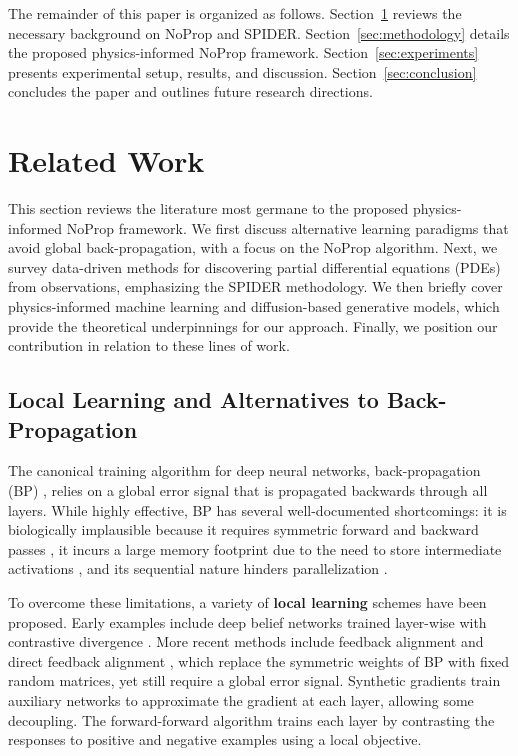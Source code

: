 \documentclass[preprint,12pt]{elsarticle}
\begin{document}
The remainder of this paper is organized as follows. Section~\ref{sec:related} reviews the necessary background on NoProp and SPIDER. Section~\ref{sec:methodology} details the proposed physics-informed NoProp framework. Section~\ref{sec:experiments} presents experimental setup, results, and discussion. Section~\ref{sec:conclusion} concludes the paper and outlines future research directions.


\section{Related Work}
\label{sec:related}

This section reviews the literature most germane to the proposed physics-informed NoProp framework. We first discuss alternative learning paradigms that avoid global back-propagation, with a focus on the NoProp algorithm. Next, we survey data-driven methods for discovering partial differential equations (PDEs) from observations, emphasizing the SPIDER methodology. We then briefly cover physics-informed machine learning and diffusion-based generative models, which provide the theoretical underpinnings for our approach. Finally, we position our contribution in relation to these lines of work.

\subsection{Local Learning and Alternatives to Back-Propagation}
\label{sec:local-learning}

The canonical training algorithm for deep neural networks, back-propagation (BP) \cite{rumelhart1986learning}, relies on a global error signal that is propagated backwards through all layers. While highly effective, BP has several well-documented shortcomings: it is biologically implausible because it requires symmetric forward and backward passes \cite{grossberg1987competitive,lillicrap2016random}, it incurs a large memory footprint due to the need to store intermediate activations \cite{rumelhart1986learning}, and its sequential nature hinders parallelization \cite{carreira2014distributed}.

To overcome these limitations, a variety of \textbf{local learning} schemes have been proposed. Early examples include deep belief networks trained layer-wise with contrastive divergence \cite{hinton2006fast}. More recent methods include feedback alignment \cite{lillicrap2016random} and direct feedback alignment \cite{nokland2016direct}, which replace the symmetric weights of BP with fixed random matrices, yet still require a global error signal. Synthetic gradients \cite{jaderberg2017decoupled} train auxiliary networks to approximate the gradient at each layer, allowing some decoupling. The forward-forward algorithm \cite{hinton2022forward} trains each layer by contrasting the responses to positive and negative examples using a local objective.
\end{document}
